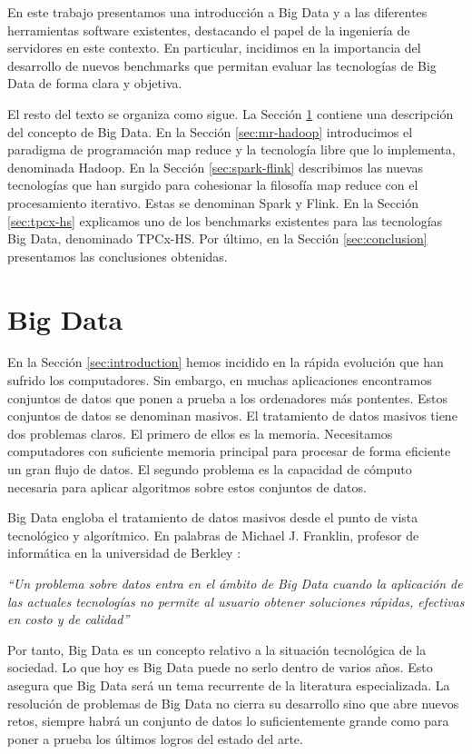\documentclass[10pt]{article}
\begin{document}
	En este trabajo presentamos una introducción a Big Data y a las diferentes herramientas software existentes, destacando el papel de la ingeniería de servidores en este contexto. En particular, incidimos en la importancia del desarrollo de nuevos benchmarks que permitan evaluar las tecnologías de Big Data de forma clara y objetiva.

	El resto del texto se organiza como sigue. La Sección \ref{sec:big-data} contiene una descripción del concepto de Big Data. En la Sección \ref{sec:mr-hadoop} introducimos el paradigma de programación map reduce y la tecnología libre que lo implementa, denominada Hadoop. En la Sección \ref{sec:spark-flink} describimos las nuevas tecnologías que han surgido para cohesionar la filosofía map reduce con el procesamiento iterativo. Estas se denominan Spark y Flink. En la Sección \ref{sec:tpcx-hs} explicamos uno de los benchmarks existentes para las tecnologías Big Data, denominado TPCx-HS. Por último, en la Sección \ref{sec:conclusion} presentamos las conclusiones obtenidas.

\section{Big Data} \label{sec:big-data}
	
	En la Sección \ref{sec:introduction} hemos incidido en la rápida evolución que han sufrido los computadores. Sin embargo, en muchas aplicaciones encontramos conjuntos de datos que ponen a prueba a los ordenadores más pontentes. Estos conjuntos de datos se denominan masivos. El tratamiento de datos masivos tiene dos problemas claros. El primero de ellos es la memoria. Necesitamos computadores con suficiente memoria principal para procesar de forma eficiente un gran flujo de datos. El segundo problema es la capacidad de cómputo necesaria para aplicar algoritmos sobre estos conjuntos de datos. 
	
	Big Data engloba el tratamiento de datos masivos desde el punto de vista tecnológico y algorítmico. En palabras de Michael J. Franklin, profesor de informática en la universidad de Berkley \cite{bd-definition}:
	
	\textit{``Un problema sobre datos entra en el ámbito de Big Data cuando la aplicación de las actuales tecnologías no permite al usuario obtener soluciones  rápidas, efectivas en costo y de calidad''}

	Por tanto, Big Data es un concepto relativo a la situación tecnológica de la sociedad. Lo que hoy es Big Data puede no serlo dentro de varios años. Esto asegura que Big Data será un tema recurrente de la literatura especializada. La resolución de problemas de Big Data no cierra su desarrollo sino que abre nuevos retos, siempre habrá un conjunto de datos lo suficientemente grande como para poner a prueba los últimos logros del estado del arte.
\end{document}
